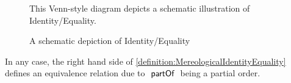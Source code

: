 \begin{figure}[h!]
\begin{center}
\end{center}
\begin{center}
{
\scriptsize 
This Venn-style diagram depicts a schematic illustration of Identity/Equality.
}
\end{center}
\caption{A schematic depiction of Identity/Equality}
\label{figure:SchematicEquality}
\end{figure}

In any case, the right hand side of \ref{definition:MereologicalIdentityEquality} defines an equivalence relation due to $~\textsf{partOf}~$ being a partial order.


